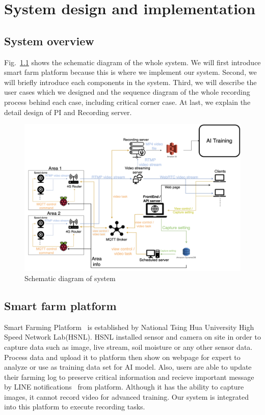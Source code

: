 \chapter{System design and implementation}
\label{c:system-design-and-implementation}


\graphicspath{{./figsrc/}}
\fi

\section{System overview}
Fig.~\ref{fig:big-system} shows the schematic diagram of the whole system. We will first introduce smart farm platform because this is where we implement our system. Second, we will briefly introduce each components in the system. Third, we will describe the user cases which we designed and the sequence diagram of the whole recording process behind each case, including critical corner case. At last, we explain the detail design of PI and Recording server.

\begin{figure}[H]
    \centering
    \includegraphics[width=\textwidth]{figsrc/big-system.png}
    \caption{Schematic diagram of system\label{fig:big-system}}
\end{figure}

\section{Smart farm platform}
Smart Farming Platform~\cite{agri-web} is established by National Tsing Hua University High Speed Network Lab(HSNL). HSNL installed sensor and camera on site in order to capture data such as image, live stream, soil moisture or any other sensor data. Process data and upload it to platform then show on webpage for expert to analyze or use as training data set for AI model. Also, users are able to update their farming log to preserve critical information and recieve important message by LINE notifications~\cite{line-notify} from platform. Although it has the ability to capture images, it cannot record video for advanced training. Our system is integrated into this platform to execute recording tasks.

